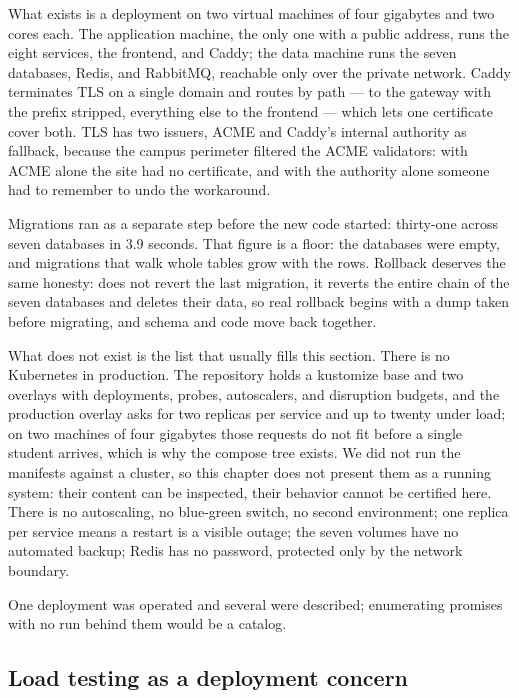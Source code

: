What exists is a deployment on two virtual machines of four gigabytes and two cores each. The
application machine, the only one with a public address, runs the eight services, the frontend, and
Caddy; the data machine runs the seven databases, Redis, and RabbitMQ, reachable only over the private
network. Caddy terminates TLS on a single domain and routes by path —  to the gateway
with the prefix stripped, everything else to the frontend — which lets one certificate cover both.
TLS has two issuers, ACME and Caddy's internal authority as fallback, because the campus perimeter
filtered the ACME validators: with ACME alone the site had no certificate, and with the authority
alone someone had to remember to undo the workaround.

Migrations ran as a separate step before the new code started: thirty-one across seven databases in
3.9 seconds. That figure is a floor: the databases were empty, and migrations that walk whole tables grow with the
rows. Rollback deserves the same honesty:  does not revert the last migration, it reverts the entire chain of the seven databases and
deletes their data, so real rollback begins with a dump taken before migrating, and schema and code
move back together.

What does not exist is the list that usually fills this section. There is no Kubernetes in production.
The repository holds a kustomize base and two overlays with deployments, probes, autoscalers, and
disruption budgets, and the production overlay asks for two replicas per service and up to twenty
under load; on two machines of four gigabytes those requests do not fit before a single student
arrives, which is why the compose tree exists. We did not run the manifests against a cluster, so this
chapter does not present them as a running system: their content can be inspected, their behavior
cannot be certified here. There is no autoscaling, no blue-green switch, no
second environment; one replica per service means a restart is a visible outage; the seven volumes
have no automated backup; Redis has no password, protected only by the network boundary.

One deployment was operated and several were described; enumerating promises with no run behind them
would be a catalog.

\subsection{Load testing as a deployment concern}

